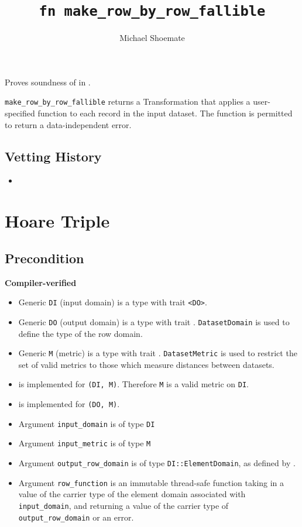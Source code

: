 \documentclass{article}
\title{\texttt{fn make\_row\_by\_row\_fallible}}
\author{Michael Shoemate}
\date{}
\begin{document}
 
 
\maketitle 
 
Proves soundness of  in . 
 
\texttt{make\_row\_by\_row\_fallible} returns a Transformation that applies a user-specified function to each record in the input dataset. 
The function is permitted to return a data-independent error. 
 
\subsection*{Vetting History} 
\begin{itemize} 
    \item {} 
\end{itemize} 
 
\section{Hoare Triple} 
\subsection*{Precondition} 
 
\textbf{Compiler-verified} 
\begin{itemize} 
    \item Generic \texttt{DI} (input domain) is a type with trait \texttt{<DO>}.  
    \item Generic \texttt{DO} (output domain) is a type with trait .  
        \texttt{DatasetDomain} is used to define the type of the row domain. 
    \item Generic \texttt{M} (metric) is a type with trait .  
        \texttt{DatasetMetric} is used to restrict the set of valid metrics to those which measure distances between datasets. 
    \item {} is implemented for \texttt{(DI, M)}. Therefore \texttt{M} is a valid metric on \texttt{DI}. 
    \item {} is implemented for \texttt{(DO, M)}. 
    \item Argument \texttt{input\_domain} is of type \texttt{DI} 
    \item Argument \texttt{input\_metric} is of type \texttt{M} 
    \item Argument \texttt{output\_row\_domain} is of type \texttt{DI::ElementDomain}, as defined by . 
    \item Argument \texttt{row\_function} is an immutable thread-safe function taking in a value of the carrier type of the element domain associated with \texttt{input\_domain},  
    and returning a value of the carrier type of \texttt{output\_row\_domain} or an error. 
\end{itemize} 
 
\end{document}
